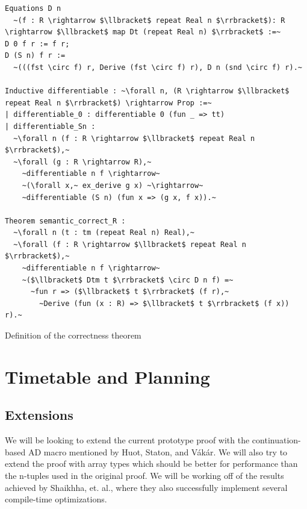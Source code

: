 \documentclass[11pt, final]{article}
\def\Vakar{V\'{a}k\'{a}r}
\begin{document}
\begin{listing}
  \begin{verbatim}
Equations D n
  ~(f : R \rightarrow $\llbracket$ repeat Real n $\rrbracket$): R \rightarrow $\llbracket$ map Dt (repeat Real n) $\rrbracket$ :=~
D 0 f r := f r;
D (S n) f r :=
  ~(((fst \circ f) r, Derive (fst \circ f) r), D n (snd \circ f) r).~

Inductive differentiable : ~\forall n, (R \rightarrow $\llbracket$ repeat Real n $\rrbracket$) \rightarrow Prop :=~
| differentiable_0 : differentiable 0 (fun _ => tt)
| differentiable_Sn :
  ~\forall n (f : R \rightarrow $\llbracket$ repeat Real n $\rrbracket$),~
  ~\forall (g : R \rightarrow R),~
    ~differentiable n f \rightarrow~
    ~(\forall x,~ ex_derive g x) ~\rightarrow~
    ~differentiable (S n) (fun x => (g x, f x)).~

Theorem semantic_correct_R :
  ~\forall n (t : tm (repeat Real n) Real),~
  ~\forall (f : R \rightarrow $\llbracket$ repeat Real n $\rrbracket$),~
    ~differentiable n f \rightarrow~
    ~($\llbracket$ Dtm t $\rrbracket$ \circ D n f) =~
      ~fun r => ($\llbracket$ t $\rrbracket$ (f r),~
        ~Derive (fun (x : R) => $\llbracket$ t $\rrbracket$ (f x)) r).~
  \end{verbatim}
  \caption{Definition of the correctness theorem}
  \label{lst:direct_correctness}
\end{listing}

\section{Timetable and Planning}

\subsection{Extensions}

We will be looking to extend the current prototype proof with the continuation-based AD macro mentioned by Huot, Staton, and \Vakar{}\cite{huot2020correctness}.
We will also try to extend the proof with array types which should be better for performance than the n-tuples used in the original proof.
We will be working off of the results achieved by Shaikhha, et. al.\cite{Shaikha2019}, where they also successfully implement several compile-time optimizations. %
\end{document}

